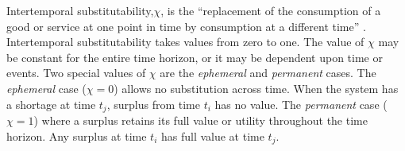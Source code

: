 \documentclass[preprint,12pt]{elsarticle}
\begin{document}
Intertemporal substitutability,$\chi$, is the ``replacement of the consumption
of a good or service at one point in time by consumption at a
different time'' \cite{Black2013}. Intertemporal substitutability takes 
values from zero to one. The value of $\chi$ may be constant for the
entire time horizon, or it may be dependent upon time or events. Two
special values of $\chi$ are the \emph{ephemeral} and \emph{permanent}
cases. The \emph{ephemeral} case ($\chi = 0$) allows no substitution across
time. When the system has a shortage at time $t_j$, surplus from time
$t_i$ has no value. The  \emph{permanent} case ($\chi = 1$) where a
surplus retains its full value or utility throughout the time
horizon. Any surplus at time $t_i$ has full value at time $t_j$.





\end{document}

